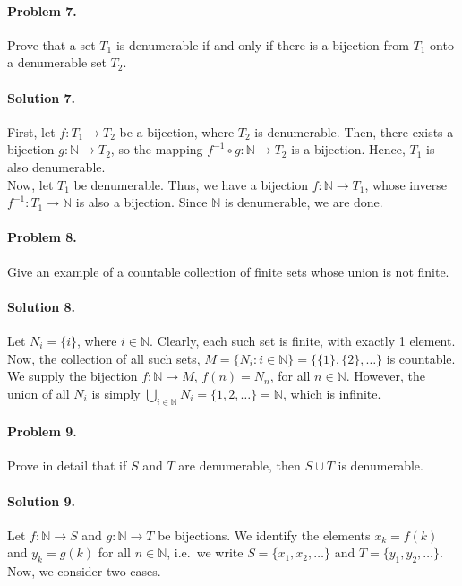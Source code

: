 \documentclass[10pt]{article}
\begin{document}
        \paragraph{Problem 7.} Prove that a set $T_1$ is denumerable if and only if there is a bijection from $T_1$ onto a denumerable set $T_2$.
        \paragraph{Solution 7.} First, let $f\colon T_1 \to T_2$ be a bijection, where $T_2$ is denumerable.
        Then, there exists a bijection $g\colon \mathbb{N} \to T_2$, so the mapping $f^{-1}\circ g\colon \mathbb{N} \to T_2$ is a bijection.
        Hence, $T_1$ is also denumerable.\\

        Now, let $T_1$ be denumerable. Thus, we have a bijection $f\colon \mathbb{N} \to T_1$, whose inverse $f^{-1}\colon T_1 \to \mathbb{N}$
        is also a bijection. Since $\mathbb{N}$ is denumerable, we are done.
        
        \paragraph{Problem 8.} Give an example of a countable collection of finite sets whose union is not finite.
        \paragraph{Solution 8.} Let $N_i = \{i\}$, where $i \in \mathbb{N}$. Clearly, each such set is finite,
        with exactly 1 element. Now, the collection of all such sets,
        $M = \{N_i: i \in \mathbb{N}\} = \{\{1\}, \{2\}, \dots\}$ is countable. We supply the bijection
        $f\colon \mathbb{N} \to M$, $f(n) = N_n$, for all $n \in \mathbb{N}$.
        However, the union of all $N_i$ is simply $\bigcup_{i \in \mathbb{N}}N_i = \{1, 2, \dots\} = \mathbb{N}$, which is infinite.

        \paragraph{Problem 9.} Prove in detail that if $S$ and $T$ are denumerable, then $S\cup T$ is denumerable.
        \paragraph{Solution 9.}
        Let $f\colon \mathbb{N} \to S$ and $g\colon \mathbb{N} \to T$ be bijections. We identify the elements
        $x_k = f(k)$ and $y_k = g(k)$ for all $n \in \mathbb{N}$, i.e.\ we write $S = \{x_1, x_2, \dots\}$ and $T = \{y_1, y_2, \dots\}$.
        Now, we consider two cases. \\
        
\end{document}
